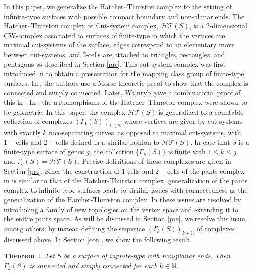 \documentclass[11pt]{article}
\def\l{\left}
\def\r{\right}
\def\N{\mathbb{N}}
\newtheorem{ntheorem}{Theorem}
\begin{document}
In this paper, we generalize the Hatcher--Thurston complex to the setting of infinite-type surfaces with possible compact boundary and non-planar ends. The Hatcher--Thurston complex or Cut-system complex, $ \mathcal{HT}(S)$, is a 2-dimensional CW-complex associated to surfaces of finite-type in which the vertices are maximal cut-systems of the surface, edges correspond to an elementary move between cut-systems, and 2-cells are attached to triangles, rectangles, and pentagons as described in Section \ref{pre}. This cut-system complex was first introduced in \cite{hatcher} to obtain a presentation for the mapping class group of finite-type surfaces. In \cite{hatcher}, the authors use a Morse-theoretic proof to show that the complex is connected and simply connected. Later, Wajnryb gave a combinatorial proof of this in \cite{wajnryb}. In \cite{irmak2004}, the automorphisms of the Hatcher--Thurston complex were shown to be geometric. In this paper, the complex $ \mathcal{HT}(S)$ is generalized to a countable collection of complexes $\l(\Gamma_k(S)\r)_{k\in \N}$ whose vertices are given by cut-systems with exactly $k$ non-separating curves, as opposed to maximal cut-systems, with $1-$cells and $2-$cells defined in a similar fashion to $ \mathcal{HT}(S)$. In case that $S$ is a finite-type surface of genus $g$, the collection $\{\Gamma_k(S)\}$ is finite with $1\leq k \leq g$ and $\Gamma_g(S) = \mathcal{HT}(S)$. Precise definitions of these complexes are given in Section \ref{pre}. Since the construction of $1$-cells and $2-$cells of the pants complex in \cite{branman} is similar to that of the Hatcher-Thurston complex, generalization of the pants complex to infinite-type surfaces leads to similar issues with connectedness as the generalization of the Hatcher-Thurston complex. In \cite{branman} these issues are resolved by introducing a family of new topologies on the vertex space and extending it to the enitre pants space. As will be discussed in Section \ref{pre}, we resolve this issue, among others, by instead defining the sequence $(\Gamma_k(S))_{k\in \N}$ of complexes discussed above. In Section \ref{con}, we show the following result.
\begin{ntheorem}\label{thm:simply} 
  Let $S$ be a surface of infinite-type with non-planar ends. Then $\Gamma_k(S)$ is connected and simply connected for each $k\in \N$.
\end{ntheorem}
\end{document}
